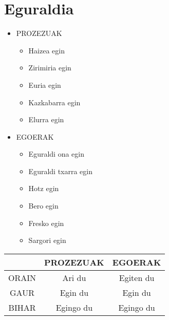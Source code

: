 \documentclass[12pt, a4paper, landscape]{article}
\begin{document}
\section{Eguraldia}
\begin{itemize}
\item PROZEZUAK
\begin{itemize}
\item Haizea egin
\item Zirimiria egin
\item Euria egin
\item Kazkabarra egin
\item Elurra egin
\end{itemize}
\item EGOERAK
\begin{itemize}
\item Eguraldi ona egin
\item Eguraldi txarra egin
\item Hotz egin
\item Bero egin
\item Fresko egin
\item Sargori egin
\end{itemize}
\end{itemize}

\begin{center}
\begin{table}[h]
\begin{tabular}{|c|c|c|}
\hline
& PROZEZUAK & EGOERAK \\
\hline
ORAIN & Ari du & Egiten du \\
GAUR & Egin du & Egin du \\
BIHAR & Egingo du & Egingo du \\
\hline
\end{tabular}
\end{table}
\end{center}
\end{document}
